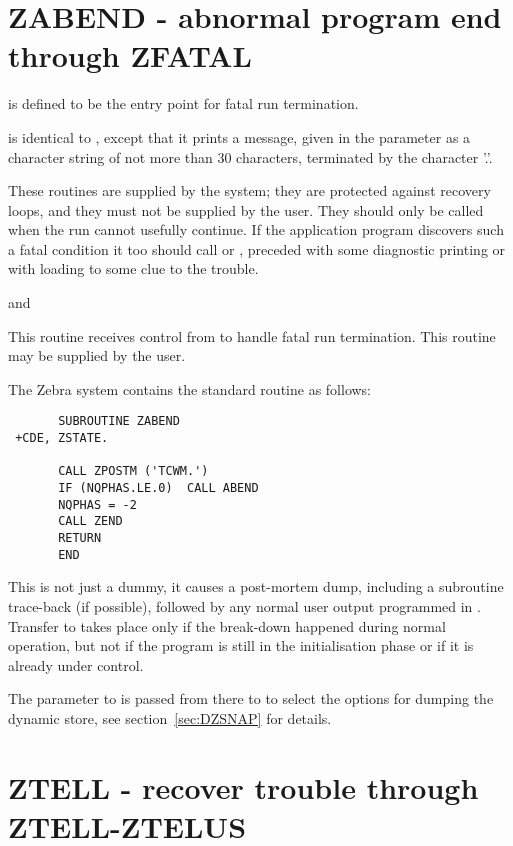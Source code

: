 \section{ZABEND - abnormal program end through ZFATAL}

is defined to be the entry point for fatal run termination.


is identical to ,
except that it prints a message,
given in the parameter as a character
string of not more than 30 characters,
terminated by the character '.'.

These routines are supplied by the system;
they are protected against recovery loops,
and they must not be supplied by the user.
They should only be called when the run cannot usefully continue.
If the application program discovers such a fatal condition
it too should call  or ,
preceded with some diagnostic printing or
with loading to \IQUEST{} some clue to the trouble.


and



This routine receives control from  to handle fatal run termination.
This routine may be supplied by the user.

The Zebra system contains the standard routine as follows:

\begin{verbatim}
       SUBROUTINE ZABEND
 +CDE, ZSTATE.

       CALL ZPOSTM ('TCWM.')
       IF (NQPHAS.LE.0)  CALL ABEND
       NQPHAS = -2
       CALL ZEND
       RETURN
       END
\end{verbatim} 

This is not just a dummy,
it causes a post-mortem dump,
including a subroutine trace-back (if possible),
followed by any normal user output programmed in .
Transfer to  takes place only if the break-down happened
during normal operation,
but not if the program is still in the initialisation phase
or if it is already under  control.

The parameter to  is passed from there to 
to select the options for dumping the dynamic store,
see section~\ref{sec:DZSNAP} for details.

\section{ZTELL  - recover trouble through ZTELL-ZTELUS}

